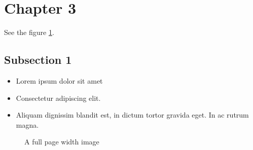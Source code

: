 \section{Chapter 3}

\lipsum[4]

See the figure \ref{fig:fullpagewidthimage}.


\subsection{Subsection 1}

\begin{itemize}
\item Lorem ipsum dolor sit amet\cite{example}
\item Consectetur adipiscing elit. 
\item Aliquam dignissim blandit est, in dictum tortor gravida eget. In ac rutrum magna.
\end{itemize}

\begin{figure}[h]
\centering
  \caption{A full page width image}
  \label{fig:fullpagewidthimage}
\end{figure}
